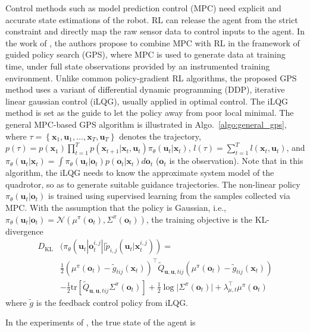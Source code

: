 \documentclass{article}
\newcommand{\B}[1]{\mathbf{#1}}
\begin{document}
Control methods such as model prediction control (MPC) need
explicit and accurate state estimations of the robot.
RL can release the agent from the strict constraint and 
directly map the raw sensor data to control inputs to the agent.
In the work of \textcite{zhang2016learning}, the authors propose to combine MPC with RL in the framework of guided policy search (GPS), where MPC is used to generate data at training time, under full state observations provided by an instrumented training environment.
Unlike common policy-gradient RL algorithms, the proposed GPS 
method uses a variant of differential dynamic programming (DDP), iterative
linear gaussian control (iLQG), usually applied in optimal 
control. 
The iLQG method is set as the guide to let the policy 
away from poor local minimal.
The general MPC-based GPS algorithm is illustrated in Algo.~\ref{algo:general_gps}, where $\tau = \left\{ \B{x}_1, \B{u}_1, \dots, \B{x}_T, \B{u}_T\right\}$ denotes the trajectory, 
$p(\tau) = p(\B{x}_1)\prod_{t=1}^{T}p(\B{x}_{t+1} | \B{x}_t, \B{u}_t)
\pi_\theta(\B{u}_t | \B{x}_t)$, 
$l(\tau) = \sum_{t=1}^T l(\B{x}_t, \B{u}_t)$, and 
$\pi_\theta(\B{u}_t | \B{x}_t) = \int \pi_\theta(\B{u}_t | \B{o}_t) p(\B{o}_t | \B{x}_t)d\B{o}_t$ 
($\B{o}_t$ is the observation).
Note that in this algorithm, the iLQG needs to know the approximate system
model of the quadrotor, so as to generate suitable guidance trajectories.
The non-linear policy $\pi_\theta(\B{u}_t | \B{o}_t)$ is trained 
using supervised learning from the samples collected via MPC.
With the assumption that the policy is Gaussian, i.e., 
$\pi_\theta(\B{u}_t | \B{o}_t) = \mathcal{N}(\mu^\pi(\B{o}_t), 
\Sigma^\pi(\B{o}_t))$, the training objective is the KL-divergence
\[
  \begin{aligned}
    D_\text{KL} & (
      \pi_\theta(\B{u}_t | \B{o}_t^{i,j} || 
      \tilde{p}_{i,j}(\B{u}_t | \B{x}_t^{i,j})) = \\
      &\frac{1}{2} (\mu^\pi(\B{o}_t) - \tilde{g}_{tij}(\B{x}_t))^\top
      \tilde{Q}_{\B{u},\B{u},tij}
      (\mu^\pi(\B{o}_t) - \tilde{g}_{tij}(\B{x}_t)) \\
      & -\frac{1}{2}\text{tr}\left[
        \tilde{Q}_{\B{u},\B{u},tij}\Sigma^\pi(\B{o}_t)
      \right]
      + \frac{1}{2}\log{\lvert \Sigma^\pi(\B{o}_t) \rvert}
      + \lambda^\top_{\mu,t}\mu^\pi(\B{o}_t)
  \end{aligned}
\]
where $\tilde{g}$ is the feedback control policy from iLQG.

In the experiments of \textcite{zhang2016learning}, the true state 
of the agent is 
\end{document}
